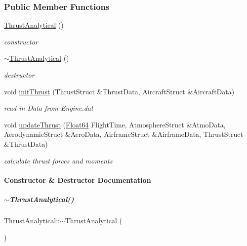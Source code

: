 \subsubsection*{Public Member Functions}
\begin{DoxyCompactItemize}
\item 
\mbox{\label{group___engine_a5c75949a22871e861090560adb2d5f18}} 
\hyperlink{group___engine_a5c75949a22871e861090560adb2d5f18}{Thrust\+Analytical} ()
\begin{DoxyCompactList}\small\item\em constructor \end{DoxyCompactList}\item 
\hyperlink{group___engine_aeaf9dd69c10812c673d6cfae0d7ca4fd}{$\sim$\+Thrust\+Analytical} ()
\begin{DoxyCompactList}\small\item\em destructor \end{DoxyCompactList}\item 
void \hyperlink{group___engine_a5eb762aee5e5823fa34b2236d9b21134}{init\+Thrust} (Thrust\+Struct \&Thrust\+Data, Aircraft\+Struct \&Aircraft\+Data)
\begin{DoxyCompactList}\small\item\em read in Data from Engine.\+dat \end{DoxyCompactList}\item 
void \hyperlink{group___engine_a3907d6febaf711a225c0abfe8022304f}{update\+Thrust} (\hyperlink{group___tools_ga3f1431cb9f76da10f59246d1d743dc2c}{Float64} Flight\+Time, Atmosphere\+Struct \&Atmo\+Data, Aerodynamic\+Struct \&Aero\+Data, Airframe\+Struct \&Airframe\+Data, Thrust\+Struct \&Thrust\+Data)
\begin{DoxyCompactList}\small\item\em calculate thrust forces and moments \end{DoxyCompactList}\end{DoxyCompactItemize}


\paragraph{Constructor \& Destructor Documentation}
\mbox{\label{group___engine_aeaf9dd69c10812c673d6cfae0d7ca4fd}} 
\subparagraph{\texorpdfstring{$\sim$\+Thrust\+Analytical()}{~ThrustAnalytical()}}
{\footnotesize\ttfamily Thrust\+Analytical\+::$\sim$\+Thrust\+Analytical (\begin{DoxyParamCaption}{ }\end{DoxyParamCaption})}



